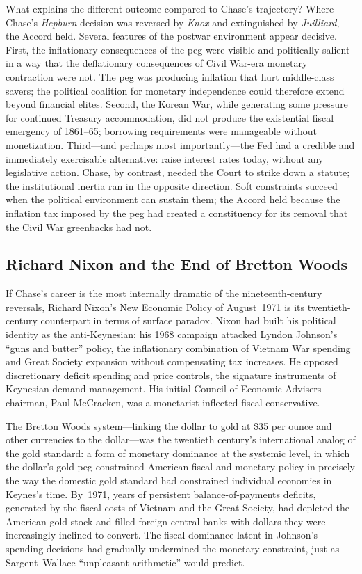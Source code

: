 \documentclass[12pt]{article}
\begin{document}
What explains the different outcome compared to Chase's trajectory?  Where
Chase's \textit{Hepburn} decision was reversed by \textit{Knox} and
extinguished by \textit{Juilliard}, the Accord held.  Several features of
the postwar environment appear decisive.  First, the inflationary
consequences of the peg were visible and politically salient in a way
that the deflationary consequences of Civil War-era monetary contraction
were not.  The peg was producing inflation that hurt middle-class savers;
the political coalition for monetary independence could therefore extend
beyond financial elites.  Second, the Korean War, while generating some
pressure for continued Treasury accommodation, did not produce the
existential fiscal emergency of 1861--65; borrowing requirements were
manageable without monetization.  Third---and perhaps most
importantly---the Fed had a credible and immediately exercisable
alternative: raise interest rates today, without any legislative action.
Chase, by contrast, needed the Court to strike down a statute; the
institutional inertia ran in the opposite direction.  Soft constraints
succeed when the political environment can sustain them; the Accord held
because the inflation tax imposed by the peg had created a constituency
for its removal that the Civil War greenbacks had not.

\subsection{Richard Nixon and the End of Bretton Woods}

If Chase's career is the most internally dramatic of the nineteenth-century
reversals, Richard Nixon's New Economic Policy of August~1971 is its
twentieth-century counterpart in terms of surface paradox.  Nixon had
built his political identity as the anti-Keynesian: his 1968 campaign
attacked Lyndon Johnson's ``guns and butter'' policy, the inflationary
combination of Vietnam War spending and Great Society expansion without
compensating tax increases.  He opposed discretionary deficit spending
and price controls, the signature instruments of Keynesian demand
management.  His initial Council of Economic Advisers chairman, Paul
McCracken, was a monetarist-inflected fiscal conservative.

The Bretton Woods system---linking the dollar to gold at \$35 per ounce
and other currencies to the dollar---was the twentieth century's
international analog of the gold standard: a form of monetary dominance
at the systemic level, in which the dollar's gold peg constrained American
fiscal and monetary policy in precisely the way the domestic gold
standard had constrained individual economies in Keynes's time.  By~1971,
years of persistent balance-of-payments deficits, generated by the fiscal
costs of Vietnam and the Great Society, had depleted the American gold
stock and filled foreign central banks with dollars they were
increasingly inclined to convert.  The fiscal dominance latent in
Johnson's spending decisions had gradually undermined the monetary
constraint, just as Sargent--Wallace ``unpleasant arithmetic'' would
predict.
\end{document}
